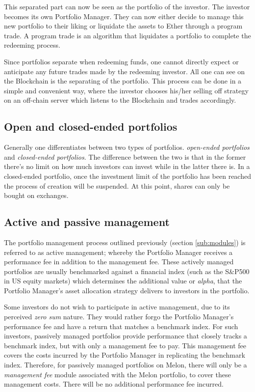 \documentclass[9pt,oneside]{amsart}
\theoremstyle{plain}
\begin{document}
\begin{multicols}{2}
    This separated part can now be seen as the portfolio of the investor. The investor becomes its own Portfolio Manager. They can now either decide to manage this new portfolio to their liking or liquidate the assets to Ether through a program trade. A program trade is an algorithm that liquidates a portfolio to complete the redeeming process.
    
    Since portfolios separate when redeeming funds, one cannot directly expect or anticipate any future trades made by the redeeming investor. All one can see on the Blockchain is the separating of the portfolio. This process can be done in a simple and convenient way, where the investor chooses his/her selling off strategy on an off-chain server which listens to the Blockchain and trades accordingly.
    
    \subsection{Open and closed-ended portfolios}\label{sub:closed}
    
    Generally one differentiates between two types of portfolios. \textit{open-ended portfolios} and \textit{closed-ended portfolios}. The difference between the two is that in the former there's no limit on how much investors can invest while in the latter there is. In a closed-ended portfolio, once the investment limit of the portfolio has been reached the process of creation will be suspended. At this point, shares can only be bought on exchanges.
    
    \subsection{Active and passive management}\label{sub:activepassive}
    
    The portfolio management process outlined previously (section \ref{sub:modules}) is referred to as active management; whereby the Portfolio Manager receives a performance fee in addition to the management fee. These actively managed portfolios are usually benchmarked against a financial index (such as the S\&P500 in US equity markets) which determines the additional value or \textit{alpha}, that the Portfolio Manager's asset allocation strategy delivers to investors in the portfolio. 
    
    Some investors do not wish to participate in active management, due to its perceived \textit{zero sum} nature\cite{sharpe}. They would rather forgo the Portfolio Manager's performance fee and have a return that matches a benchmark index. For such investors, passively managed portfolios provide performance that closely tracks a benchmark index, but with only a management fee to pay. This management fee covers the costs incurred by the Portfolio Manager in replicating the benchmark index. Therefore, for passively managed portfolios on Melon, there will only be a \textit{management fee} module associated with the Melon portfolio, to cover these management costs. There will be no additional performance fee incurred.
    

\end{multicols}
\end{document}
